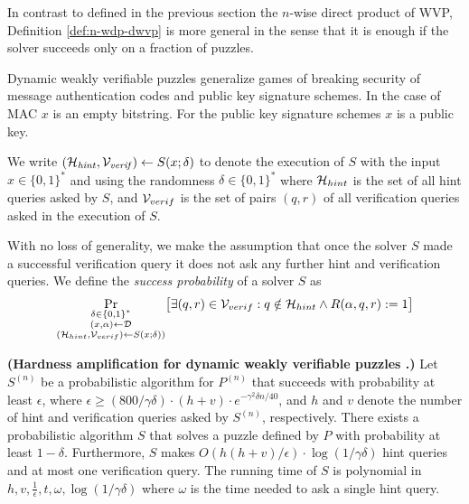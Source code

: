 In contrast to defined in the previous section the $n$-wise direct product of WVP, Definition \ref{def:n-wdp-dwvp}
is more general in the sense that it is enough if the solver succeeds only on a fraction of puzzles.

Dynamic weakly verifiable puzzles generalize games of breaking security of message authentication codes and public key signature schemes.
In the case of MAC $x$ is an empty bitstring. For the public key signature schemes $x$ is a public key.

We write $(\mathcal{H}_{\mathit{hint}}, \mathcal{V}_{\mathit{verif}}) \leftarrow S(x; \delta)$ to denote
the execution of $S$ with the input $x \in \{0,1\}^{*}$ and using the randomness $\delta \in \{0,1\}^{*}$
where $\mathcal{H}_{hint}$ is the set of all hint queries asked by $S$, and $\mathcal{V}_{verif}$ is
the set of pairs $(q,r)$ of all verification queries asked in the execution of $S$.

With no loss of generality, we make the assumption that once the solver $S$
made a successful verification query it does not ask any further hint and verification queries.
We define the \textit{success probability} of a solver $S$ as
\begin{align*}
  \underset{\substack{\delta \in \{0,1\}^{*} \\(x,\alpha) \leftarrow \mathcal{D} \\ (\mathcal{H}_{hint}, \mathcal{V}_{verif}) \leftarrow S(x;\delta))}}
  {\Pr}\big[\exists (q,r) \in \mathcal{V}_{verif} : q \notin \mathcal{H}_{hint} \land R(\alpha, q, r) := 1 \big]
\end{align*}

\begin{theorem}\textbf{(Hardness amplification for dynamic weakly verifiable puzzles \cite{Dodis:2009:SAI:1530441.1530450}.)}
\label{lemma:dwvp}
Let $S^{(n)}$ be a probabilistic algorithm for $P^{(n)}$ that succeeds with
probability at least $\epsilon$, where $\epsilon \geq (800/\gamma\delta) \cdot (h+v) \cdot e^{-\gamma^2\delta n/40}$, and $h$ and $v$
denote the number of hint and verification queries asked by $S^{(n)}$, respectively.
There exists a probabilistic algorithm $S$ that solves a puzzle defined by $P$ with probability at least $1-\delta$.
Furthermore, $S$ makes $O(h(h+v)/\epsilon) \cdot \log(1/\gamma\delta)$ hint queries and at most one verification query.
The running time of $S$ is polynomial in $h,v,\frac{1}{\epsilon}, t, \omega, \log(1/\gamma\delta)$ where
$\omega$ is the time needed to ask a single hint query.
\end{theorem}

